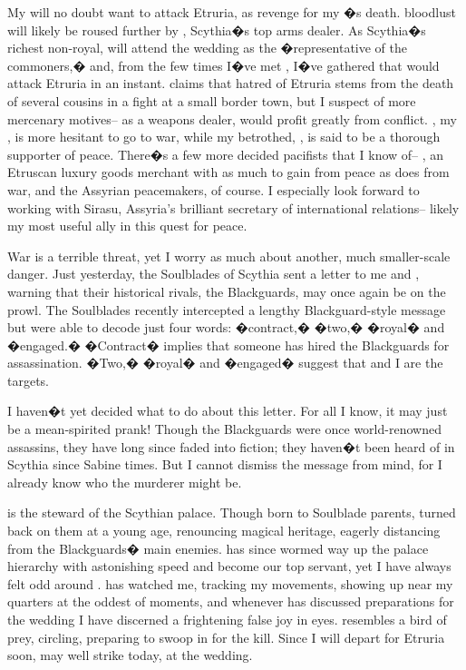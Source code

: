 \documentclass[char]{Kos}
\begin{document}
My \cScythiaQueen{\parent} will no doubt want to attack Etruria, as revenge for my \cFugitive{\sibling}�s death. \cScythiaQueen{\Their} bloodlust will likely be roused further by \cArmsDealer{}, Scythia�s top arms dealer. As Scythia�s richest non-royal, \cArmsDealer{\nickname} will attend the wedding as the �representative of the commoners,� and, from the few times I�ve met \cArmsDealer{\them}, I�ve gathered that \cArmsDealer{\they} would attack Etruria in an instant. \cArmsDealer{\They} claims that \cArmsDealer{\their} hatred of Etruria stems from the death of several cousins in a fight at a small border town, but I suspect \cArmsDealer{\them} of more mercenary motives-- as a weapons dealer, \cArmsDealer{\nickname} would profit greatly from conflict. \cScythiaKing{\nickname}, my \cScythiaKing{\parent}, is more hesitant to go to war, while my betrothed, \cGroom{\them}, is said to be a thorough supporter of peace. There�s a few more decided pacifists that I know of-- \cMerchant{}, an Etruscan luxury goods merchant with as much to gain from peace as \cArmsDealer{\nickname} does from war, and the Assyrian peacemakers, of course. I especially look forward to working with Sirasu, Assyria's brilliant secretary of international relations-- likely my most useful ally in this quest for peace.

War is a terrible threat, yet I worry as much about another, much smaller-scale danger. Just yesterday, the Soulblades of Scythia sent a letter to me and \cGroom{\nickname}, warning that their historical rivals, the Blackguards, may once again be on the prowl. The Soulblades recently intercepted a lengthy Blackguard-style message but were able to decode just four words: �contract,� �two,� �royal� and �engaged.� �Contract� implies that someone has hired the Blackguards for assassination. �Two,� �royal� and �engaged� suggest that \cGroom{\nickname} and I are the targets.

I haven�t yet decided what to do about this letter. For all I know, it may just be a mean-spirited prank! Though the Blackguards were once world-renowned assassins, they have long since faded into fiction; they haven�t been heard of in Scythia since Sabine times. But I cannot dismiss the message from mind, for I already know who the murderer might be.

 is the steward of the Scythian palace. Though born to Soulblade parents,  turned  back on them at a young age, renouncing  magical heritage, eagerly distancing  from the Blackguards� main enemies.  has since wormed  way up the palace hierarchy with astonishing speed and become our top servant, yet I have always felt odd around .  has watched me, tracking my movements, showing up near my quarters at the oddest of moments, and whenever  has discussed preparations for the wedding I have discerned a frightening false joy in  eyes.  resembles a bird of prey, circling, preparing to swoop in for the kill. Since I will depart for Etruria soon,  may well strike today, at the wedding.
\end{document}
